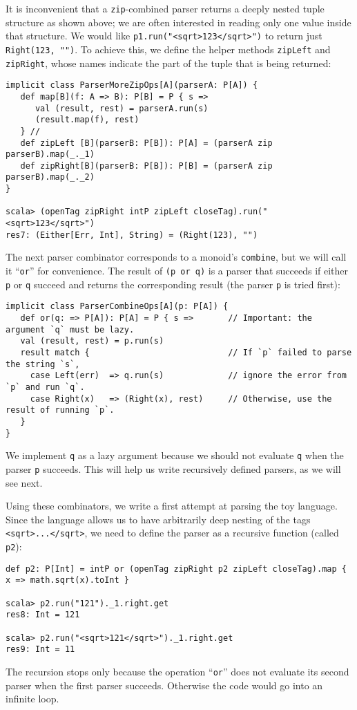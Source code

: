 It is inconvenient that a \lstinline!zip!-combined parser returns
a deeply nested tuple structure as shown above; we are often interested
in reading only one value inside that structure. We would like \lstinline!p1.run("<sqrt>123</sqrt>")!
to return just \lstinline!Right(123, "")!. To achieve this, we define
the helper methods \lstinline!zipLeft! and \lstinline!zipRight!,
whose names indicate the part of the tuple that is being returned:
\begin{lstlisting}
implicit class ParserMoreZipOps[A](parserA: P[A]) {
   def map[B](f: A => B): P[B] = P { s =>
      val (result, rest) = parserA.run(s)
      (result.map(f), rest)
   } // 
   def zipLeft [B](parserB: P[B]): P[A] = (parserA zip parserB).map(_._1)
   def zipRight[B](parserB: P[B]): P[B] = (parserA zip parserB).map(_._2)
}

scala> (openTag zipRight intP zipLeft closeTag).run("<sqrt>123</sqrt>")
res7: (Either[Err, Int], String) = (Right(123), "")
\end{lstlisting}

The next parser combinator corresponds to a monoid\textsf{'}s \lstinline!combine!,
but we will call it \textsf{``}\lstinline!or!\textsf{''} for convenience. The result
of \lstinline!(p or q)! is a parser that succeeds if either \lstinline!p!
or \lstinline!q! succeed and returns the corresponding result (the
parser \lstinline!p! is tried first):
\begin{lstlisting}
implicit class ParserCombineOps[A](p: P[A]) {
   def or(q: => P[A]): P[A] = P { s =>       // Important: the argument `q` must be lazy.
   val (result, rest) = p.run(s)
   result match {                            // If `p` failed to parse the string `s`,
     case Left(err)  => q.run(s)             // ignore the error from `p` and run `q`.
     case Right(x)   => (Right(x), rest)     // Otherwise, use the result of running `p`.
   }
}    
\end{lstlisting}
We implement \lstinline!q! as a lazy argument because we should not
evaluate \lstinline!q! when the parser \lstinline!p! succeeds. This
will help us write recursively defined parsers, as we will see next.

Using these combinators, we write a first attempt at parsing the toy
language. Since the language allows us to have arbitrarily deep nesting
of the tags \lstinline!<sqrt>...</sqrt>!, we need to define the parser
as a recursive function (called \lstinline!p2!):
\begin{lstlisting}
def p2: P[Int] = intP or (openTag zipRight p2 zipLeft closeTag).map { x => math.sqrt(x).toInt }

scala> p2.run("121")._1.right.get
res8: Int = 121

scala> p2.run("<sqrt>121</sqrt>")._1.right.get
res9: Int = 11
\end{lstlisting}
The recursion stops only because the operation \textsf{``}\lstinline!or!\textsf{''}
does not evaluate its second parser when the first parser succeeds.
Otherwise the code would go into an infinite loop.

